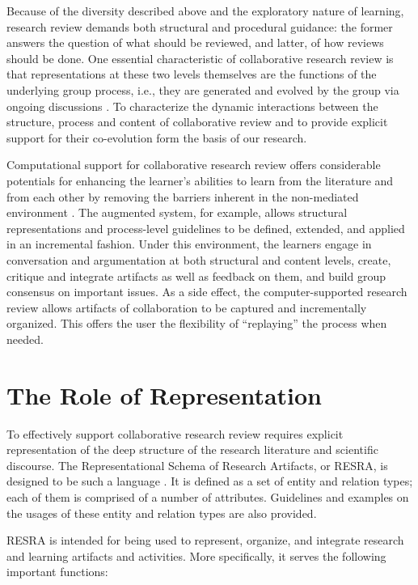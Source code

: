 Because of the diversity described above and the exploratory nature of
learning, research review demands both structural and procedural guidance:
the former answers the question of what should be reviewed, and latter, of
how reviews should be done. One essential characteristic of collaborative
research review is that representations at these two levels themselves are
the functions of the underlying group process, i.e., they are generated and
evolved by the group via ongoing discussions \cite{csdl-92-01}. To
characterize the dynamic interactions between the structure, process and
content of collaborative review and to provide explicit support for their
co-evolution form the basis of our research.

Computational support for collaborative research review offers considerable
potentials for enhancing the learner's abilities to learn from the
literature and from each other by removing the barriers inherent in the
non-mediated environment \cite{csdl-92-03}. The augmented system, for
example, allows structural representations and process-level guidelines to
be defined, extended, and applied in an incremental fashion. Under this
environment, the learners engage in conversation and argumentation at both
structural and content levels, create, critique and integrate artifacts as
well as feedback on them, and build group consensus on important issues. As
a side effect, the computer-supported research review allows artifacts of
collaboration to be captured and incrementally organized. This offers the
user the flexibility of ``replaying'' the process when needed.


\section{The Role of Representation}

To effectively support collaborative research review requires explicit
representation of the deep structure of the research literature and
scientific discourse. The Representational Schema of Research Artifacts, or
RESRA, is designed to be such a language \cite{csdl-92-03}. It is defined
as a set of entity and relation types; each of them is comprised of a
number of attributes. Guidelines and examples on the usages of these entity
and relation types are also provided. 

RESRA is intended for being used to represent, organize, and integrate
research and learning artifacts and activities. More specifically, it
serves the following important functions:

